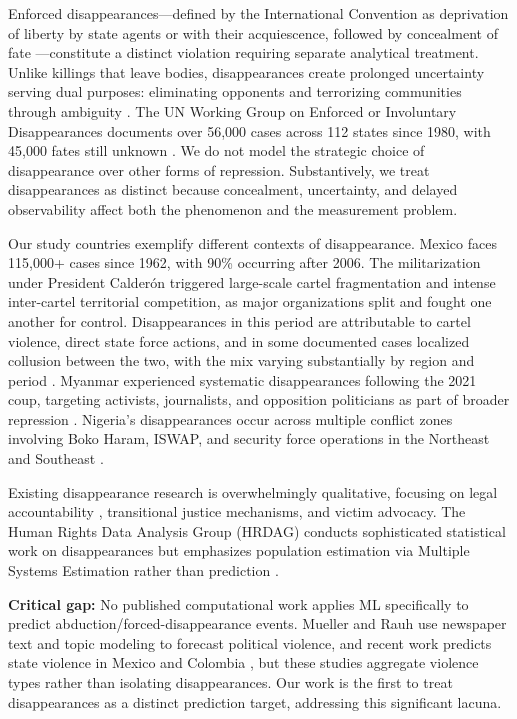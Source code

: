 \documentclass[pdflatex,sn-mathphys-num]{sn-jnl}%
\theoremstyle{thmstyleone}%
\theoremstyle{thmstyletwo}%
\theoremstyle{thmstylethree}%
\begin{document}
Enforced disappearances---defined by the International Convention as deprivation of liberty by state agents or with their acquiescence, followed by concealment of fate \cite{icpped2006}---constitute a distinct violation requiring separate analytical treatment. Unlike killings that leave bodies, disappearances create prolonged uncertainty serving dual purposes: eliminating opponents and terrorizing communities through ambiguity \cite{amnesty2024disappearances}. The UN Working Group on Enforced or Involuntary Disappearances documents over 56,000 cases across 112 states since 1980, with 45,000 fates still unknown \cite{unwged2023}. We do not model the strategic choice of disappearance over other forms of repression. Substantively, we treat disappearances as distinct because concealment, uncertainty, and delayed observability affect both the phenomenon and the measurement problem.

Our study countries exemplify different contexts of disappearance. Mexico faces 115,000+ cases since 1962, with 90\% occurring after 2006. The militarization under President Calder\'{o}n triggered large-scale cartel fragmentation and intense inter-cartel territorial competition, as major organizations split and fought one another for control. Disappearances in this period are attributable to cartel violence, direct state force actions, and in some documented cases localized collusion between the two, with the mix varying substantially by region and period \cite{umnmexico2024}. Myanmar experienced systematic disappearances following the 2021 coup, targeting activists, journalists, and opposition politicians as part of broader repression \cite{hrwmyanmar2021}. Nigeria's disappearances occur across multiple conflict zones involving Boko Haram, ISWAP, and security force operations in the Northeast and Southeast \cite{trialintl2024}.

Existing disappearance research is overwhelmingly qualitative, focusing on legal accountability \cite{reyes2024harmonizing}, transitional justice mechanisms, and victim advocacy. The Human Rights Data Analysis Group (HRDAG) conducts sophisticated statistical work on disappearances but emphasizes population estimation via Multiple Systems Estimation rather than prediction \cite{hrdag2024datasets}.

\textbf{Critical gap:} No published computational work applies ML specifically to predict abduction/forced-disappearance events. Mueller and Rauh \cite{mueller2018reading} use newspaper text and topic modeling to forecast political violence, and recent work predicts state violence in Mexico and Colombia \cite{gelvez2025predicting}, but these studies aggregate violence types rather than isolating disappearances. Our work is the first to treat disappearances as a distinct prediction target, addressing this significant lacuna.
\end{document}
